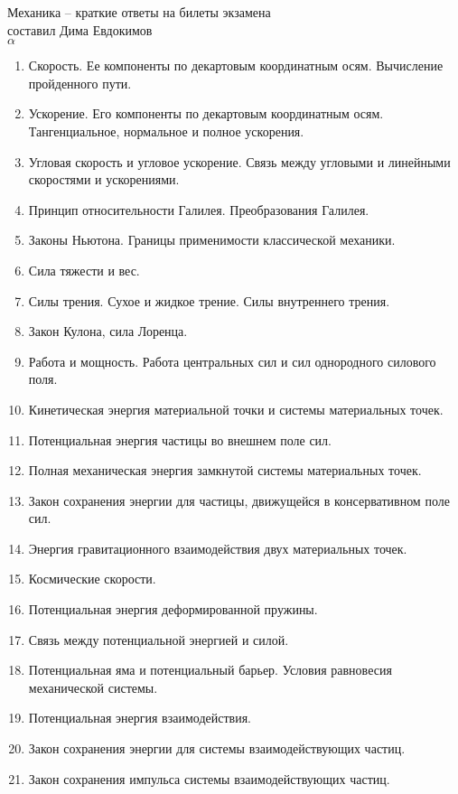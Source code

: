 \documentclass{article}
\begin{document}
\begin{center}
    \large{Механика -- краткие ответы на билеты экзамена}\\
    \large{составил Дима Евдокимов}\\
    \large{$\alpha$}\\
\end{center}  

\small
\begin{enumerate}
\item Скорость. Ее компоненты по декартовым координатным осям. Вычисление пройденного пути.
\item Ускорение. Его компоненты по декартовым координатным осям. Тангенциальное, нормальное и полное ускорения.
\item Угловая скорость и угловое ускорение. Связь между угловыми и линейными скоростями и ускорениями.
\item Принцип относительности Галилея. Преобразования Галилея.
\item Законы Ньютона. Границы применимости классической механики.
\item Сила тяжести и вес.
\item Силы трения. Сухое и жидкое трение. Силы внутреннего трения.
\item Закон Кулона, сила Лоренца.
\item Работа и мощность. Работа центральных сил и сил однородного силового поля.
\item Кинетическая энергия материальной точки и системы материальных точек.
\item Потенциальная энергия частицы во внешнем поле сил.
\item Полная механическая энергия замкнутой системы материальных точек.
\item Закон сохранения энергии для частицы, движущейся в консервативном поле сил.
\item Энергия гравитационного взаимодействия двух материальных точек.
\item Космические скорости.
\item Потенциальная энергия деформированной пружины.
\item Связь между потенциальной энергией и силой.
\item Потенциальная яма и потенциальный барьер. Условия равновесия механической системы.
\item Потенциальная энергия взаимодействия.
\item Закон сохранения энергии для системы взаимодействующих частиц.
\item Закон сохранения импульса системы взаимодействующих частиц.

\end{enumerate}
\end{document}
